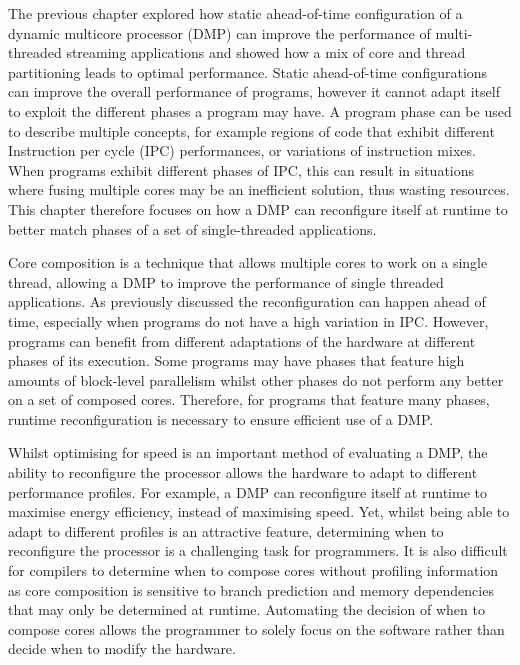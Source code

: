 The previous chapter explored how static ahead-of-time configuration of a dynamic multicore processor (DMP) can improve the performance of multi-threaded streaming applications and showed how a mix of core and thread partitioning leads to optimal performance.
Static ahead-of-time configurations can improve the overall performance of programs, however it cannot adapt itself to exploit the different phases a program may have.
A program phase can be used to describe multiple concepts, for example regions of code that exhibit different Instruction per cycle (IPC) performances, or variations of instruction mixes.
When programs exhibit different phases of IPC, this can result in situations where fusing multiple cores may be an inefficient solution, thus wasting resources.
This chapter therefore focuses on how a DMP can reconfigure itself at runtime to better match phases of a set of single-threaded applications.

Core composition is a technique that allows multiple cores to work on a single thread, allowing a DMP to improve the performance of single threaded applications.
As previously discussed the reconfiguration can happen ahead of time, especially when programs do not have a high variation in IPC.
However, programs can benefit from different adaptations of the hardware at different phases of its execution.
Some programs may have phases that feature high amounts of block-level parallelism whilst other phases do not perform any better on a set of composed cores.
Therefore, for programs that feature many phases, runtime reconfiguration is necessary to ensure efficient use of a DMP.

Whilst optimising for speed is an important method of evaluating a DMP, the ability to reconfigure the processor allows the hardware to adapt to different performance profiles.
For example, a DMP can reconfigure itself at runtime to maximise energy efficiency, instead of maximising speed.
Yet, whilst being able to adapt to different profiles is an attractive feature, determining when to reconfigure the processor is a challenging task for programmers.
It is also difficult for compilers to determine when to compose cores without profiling information as core composition is sensitive to branch prediction and memory dependencies that may only be determined at runtime.%
Automating the decision of when to compose cores allows the programmer to solely focus on the software rather than decide when to modify the hardware.

